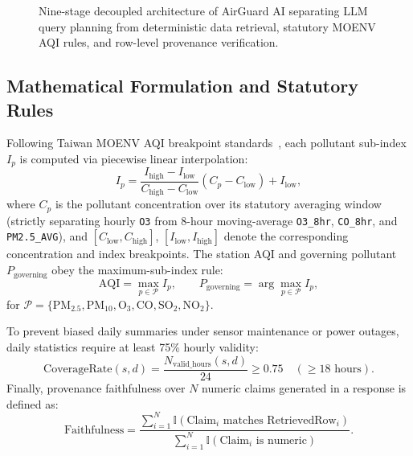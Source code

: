 \documentclass[conference]{IEEEtran}
\begin{document}
\begin{figure}[!t]
\caption{Nine-stage decoupled architecture of AirGuard AI separating LLM query planning from deterministic data retrieval, statutory MOENV AQI rules, and row-level provenance verification.}
\label{fig:architecture}
\end{figure}

\subsection{Mathematical Formulation and Statutory Rules}
Following Taiwan MOENV AQI breakpoint standards~\cite{moenv_aqi_def}, each pollutant sub-index $I_p$ is computed via piecewise linear interpolation:
\begin{equation}
I_p = \frac{I_{\text{high}} - I_{\text{low}}}{C_{\text{high}} - C_{\text{low}}} \left(C_p - C_{\text{low}}\right) + I_{\text{low}},
\label{eq:subindex}
\end{equation}
where $C_p$ is the pollutant concentration over its statutory averaging window (strictly separating hourly \texttt{O3} from 8-hour moving-average \texttt{O3\_8hr}, \texttt{CO\_8hr}, and \texttt{PM2.5\_AVG}), and $[C_{\text{low}}, C_{\text{high}}]$, $[I_{\text{low}}, I_{\text{high}}]$ denote the corresponding concentration and index breakpoints. The station AQI and governing pollutant $P_{\text{governing}}$ obey the maximum-sub-index rule:
\begin{equation}
\text{AQI} = \max_{p \in \mathcal{P}} I_p, \qquad
P_{\text{governing}} = \arg\max_{p \in \mathcal{P}} I_p,
\label{eq:aqi}
\end{equation}
for $\mathcal{P} = \{\text{PM}_{2.5}, \text{PM}_{10}, \text{O}_3, \text{CO}, \text{SO}_2, \text{NO}_2\}$.

To prevent biased daily summaries under sensor maintenance or power outages, daily statistics require at least 75\% hourly validity:
\begin{equation}
\text{CoverageRate}(s, d) = \frac{N_{\text{valid\_hours}}(s, d)}{24} \ge 0.75 \quad (\ge 18\text{ hours}).
\label{eq:coverage}
\end{equation}
Finally, provenance faithfulness over $N$ numeric claims generated in a response is defined as:
\begin{equation}
\text{Faithfulness} = \frac{\sum_{i=1}^{N} \mathbb{I}(\text{Claim}_i \text{ matches } \text{RetrievedRow}_i)}{\sum_{i=1}^{N} \mathbb{I}(\text{Claim}_i \text{ is numeric})}.
\label{eq:faithfulness}
\end{equation}
\end{document}
